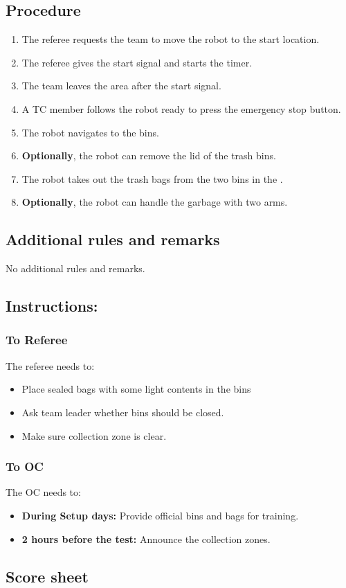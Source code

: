 \subsection*{Procedure}

\begin{enumerate}
	\item The referee requests the team to move the robot to the start location.
	\item The referee gives the start signal and starts the timer.
	\item The team leaves the area after the start signal.
	\item A TC member follows the robot ready to press the emergency stop button.
	\item The robot navigates to the bins.
	\item \textbf{Optionally}, the robot can remove the lid of the trash bins.
	\item The robot takes out the trash bags from the two bins in the \Arena{}.
	\item \textbf{Optionally}, the robot can handle the garbage with two arms.

\end{enumerate}

\subsection*{Additional rules and remarks}
	No additional rules and remarks.

\subsection*{Instructions:}

\subsubsection*{To Referee}

The referee needs to:
\begin{itemize}
	\item Place sealed bags with some light contents in the bins
	\item Ask team leader whether bins should be closed.
	\item Make sure collection zone is clear.
\end{itemize}

\subsubsection*{To OC}
The OC needs to:
\begin{itemize}[nosep]
	\item \textbf{During Setup days:} Provide official bins and bags for training.
	\item \textbf{2 hours before the test:} Announce the collection zones.
\end{itemize}

\subsection*{Score sheet}



